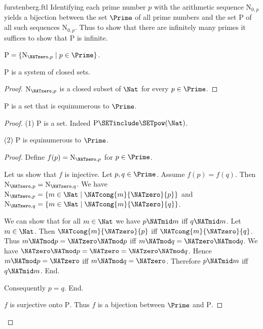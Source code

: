 \documentclass{article}
\newcommand{\N}{\mathrm{N}}
\newcommand{\Ps}{\mathrm{P}}
\begin{document}
\begin{smodule}{furstenberg.ftl}
Identifying each prime number $p$ with the arithmetic sequence $\N_{0, p}$
yields a bijection between the set $\Prime$ of all prime numbers and the set
$\Ps$ of all such sequences $\N_{0, p}$.
Thus to show that there are infinitely many primes it suffices to show that
$\Ps$ is infinite.

\begin{forthel}
  \begin{definition}
    $\Ps = \{ \N_{\NATzero, p} \mid p \in \Prime \}$.
  \end{definition}

  \begin{lemma}
    $\Ps$ is a system of closed sets.
  \end{lemma}
  \begin{proof}
    $\N_{\NATzero, p}$ is a closed subset of $\Nat$ for every $p \in \Prime$.
  \end{proof}

  \begin{lemma}
    $\Ps$ is a set that is equinumerous to $\Prime$.
  \end{lemma}
  \begin{proof}
    (1) $\Ps$ is a set.
    Indeed $\Ps \SETinclude \SETpow(\Nat)$.

    (2) $\Ps$ is equinumerous to $\Prime$.
    \begin{proof}
      Define $f(p) = \N_{\NATzero,p}$ for $p \in \Prime$.

      Let us show that $f$ is injective.
        Let $p, q \in \Prime$.
        Assume $f(p) = f(q)$.
        Then $\N_{\NATzero, p} = \N_{\NATzero, q}$.
        We have $\N_{\NATzero, p} = \{ m \in \Nat \mid \NATcong{m}{\NATzero}{p} \}$ and
        $\N_{\NATzero, q} = \{ m \in \Nat \mid \NATcong{m}{\NATzero}{q} \}$.

        We can show that for all $m \in \Nat$ we have $p \NATmid m$ iff $q \NATmid m$.
          Let $m \in \Nat$.
          Then $\NATcong{m}{\NATzero}{p}$ iff $\NATcong{m}{\NATzero}{q}$.
          Thus $m \NATmod p = \NATzero \NATmod p$ iff $m \NATmod q = \NATzero \NATmod q$.
          We have $\NATzero \NATmod p = \NATzero = \NATzero \NATmod q$.
          Hence $m \NATmod p = \NATzero$ iff $m \NATmod q = \NATzero$.
          Therefore $p \NATmid m$ iff $q \NATmid m$.
        End.

        Consequently $p = q$.
      End.

      $f$ is surjective onto $\Ps$.
      Thus $f$ is a bijection between $\Prime$ and $\Ps$.
    \end{proof}
  \end{proof}


\end{forthel}
\end{smodule}
\end{document}
